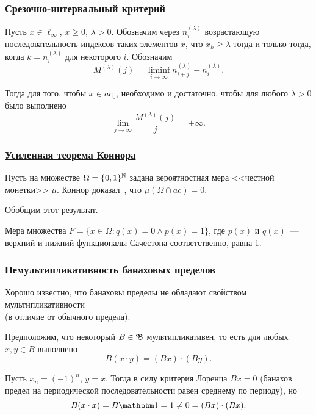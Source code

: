 \begin{frame}\frametitle{\underline{Срезочно-интервальный критерий}}
	\begin{ttheorem}
		Пусть $x\in\ell_\infty$, $x \geq 0$, $\lambda>0$.
		Обозначим через $n^{(\lambda)}_i$ возрастающую последовательность
		индексов таких элементов $x$, что $x_k \geq \lambda$ тогда и только тогда,
		когда $k=n^{(\lambda)}_i$ для некоторого $i$.
		Обозначим
		\begin{equation}
			M^{(\lambda)}(j) = \liminf_{i\to\infty} n^{(\lambda)}_{i+j} - n^{(\lambda)}_i
			.
		\end{equation}


		Тогда для того, чтобы $x\in ac_0$, необходимо и достаточно, чтобы
		для любого $\lambda>0$ было выполнено
		\begin{equation}
			\lim_{j \to \infty} \frac{M^{(\lambda)}(j)}{j} = +\infty
			.
		\end{equation}
	\end{ttheorem}
\end{frame}


\begin{frame}\frametitle{\underline{Усиленная теорема Коннора}}
	Пусть на множестве $\Omega=\{0,1\}^{\mathbb{N}}$ задана вероятностная мера <<честной монетки>> $\mu$.
	Коннор доказал~\cite{connor1990almost}, что $\mu(\Omega\cap ac)=0$.

	Обобщим этот результат.

	\begin{ttheorem}
	Мера множества $F=\{x\in\Omega : q(x) = 0 \wedge p(x)= 1\}$,
	где $p(x)$ и $q(x)$~--- верхний и нижний функционалы Сачестона соответственно,
	равна 1.
	\end{ttheorem}
\end{frame}


\begin{frame}\frametitle{Немультипликативность банаховых пределов}
	Хорошо известно,
	что банаховы пределы не обладают свойством мультипликативности
	\\
	(в отличие от обычного предела).

	Предположим, что некоторый $B\in \mathfrak{B}$ мультипликативен,
	то есть для любых $x,y\in B$ выполнено
	\begin{equation}
		B(x\cdot y) = (Bx)\cdot (By)
		.
	\end{equation}

	Пусть $x_n = (-1)^n$, $y=x$.
	Тогда в силу критерия Лоренца $Bx = 0$
	(банахов предел на периодической последовательности равен среднему по периоду),
	но
	\begin{equation}
		B(x\cdot x) = B\one = 1 \ne 0 = (Bx) \cdot (Bx)
		.
	\end{equation}


\end{frame}


